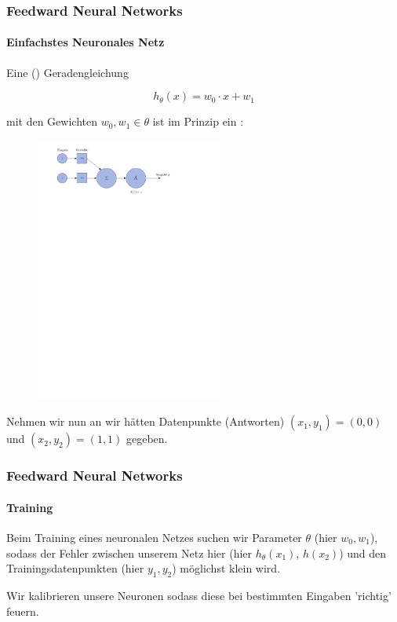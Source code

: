 \documentclass[german,aspectratio=169]{beamer}
\begin{document}
\begin{frame}
	\frametitle{Feedward Neural Networks}
	\framesubtitle{Einfachstes Neuronales Netz}
	Eine () Geradengleichung 
	
	$$h_\theta(x) = w_0 \cdot x + w_1$$
	
	mit den Gewichten $w_0, w_1 \in \theta$ ist im Prinzip ein :
	
	\begin{figure}[b]
		\includegraphics[width=0.55\textwidth]{simple-ann.pdf}
	\end{figure}
	
	Nehmen wir nun an wir hätten Datenpunkte (Antworten) $(x_1, y_1) = (0,0)$ und $(x_2, y_2) = (1,1)$ gegeben.
\end{frame}

\begin{frame}
	\frametitle{Feedward Neural Networks}
	\framesubtitle{Training}
	
	\begin{definition}
		Beim Training eines neuronalen Netzes suchen wir Parameter $\theta$ (hier $w_0, w_1$), sodass der Fehler zwischen unserem Netz hier
		(hier $h_\theta(x_1)$, $h(x_2)$) und den Trainingsdatenpunkten (hier $y_1, y_2$) möglichst klein wird.
	\end{definition}
	
	\vspace{1cm}
	Wir kalibrieren unsere Neuronen sodass diese bei bestimmten Eingaben 'richtig' feuern.
	
\end{frame}
\end{document}
